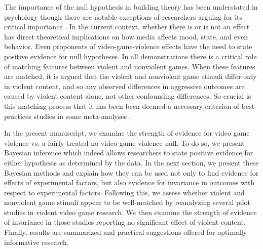 \documentclass[fignum,nobf,man]{apa}
\begin{document}
The importance of the null hypothesis in building theory has been understated in psychology though there are notable exceptions of researchers arguing for its critical importance \citep{Gallistel:2009,Rouder:etal:2009a}.  In the current context, whether there is or is not an effect has direct theoretical implications on how media affects mood, state, and even behavior.  Even proponents of video-game-violence effects have the need to state positive evidence for null hypotheses.  In all demonstrations there is a critical role of matching features between violent and nonviolent games.  When these features are matched, it is argued that the violent and nonviolent game stimuli differ only in violent content, and so any observed differences in aggressive outcomes are caused by violent content alone, not other confounding differences.  So crucial is this matching process that it has been been deemed a necessary criterion of best-practices studies in some meta-analyses \citep{Anderson:etal:2010}.

In the present manuscript, we examine the strength of evidence for video game violence vs. a fairly-treated no-video-game violence null.  To do so, we present Bayesian inference which indeed allows researchers to state positive evidence for either hypothesis as determined by the data.  In the next section, we present these Bayesian methods and explain how they can be used not only to find evidence for effects of experimental factors, but also evidence for invariance in outcomes with respect to experimental factors.  %
Following this, we assess whether violent and nonviolent game stimuli appear to be well-matched by reanalyzing several pilot studies in violent video game research.  We then examine the strength of evidence of invariance in those studies reporting no significant effect of violent content.  Finally, results are summarized and practical suggestions offered for optimally informative research. %
\end{document}
